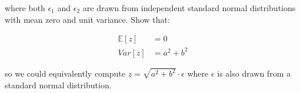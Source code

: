 \documentclass[
10pt, %
a4paper, %
oneside, %
headinclude,footinclude, %
BCOR5mm, %
]{scrartcl}
\begin{document}
where both $\epsilon_1$ and $\epsilon_2$ are drawn from independent standard normal distributions with mean zero and unit variance. Show that:

\begin{align*}
  \mathbb{E}[z] &= 0 \\
  Var[z] &= a^2 + b^2
\end{align*}

so we could equivalently compute $z = \sqrt{a^2 + b^2} \cdot \epsilon$ where $\epsilon$ is also drawn from a standard normal distribution.


\end{document}
